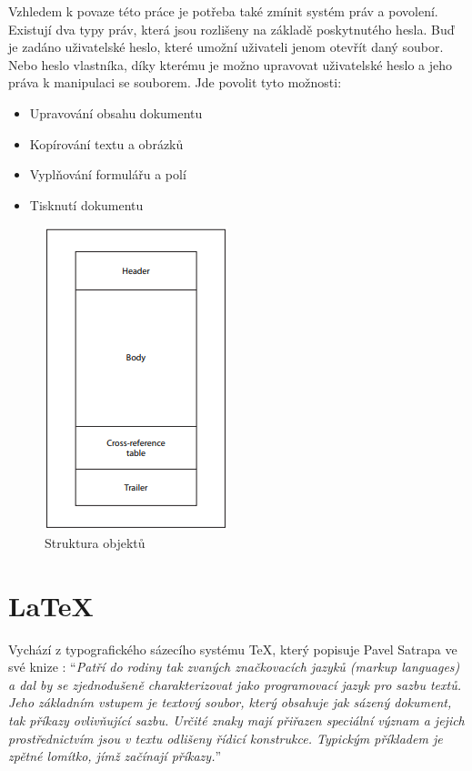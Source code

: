 	Vzhledem k povaze této práce je potřeba také zmínit systém práv a povolení. Existují dva typy práv, která jsou rozlišeny na základě poskytnutého hesla. Buď je zadáno uživatelské heslo, které umožní uživateli jenom otevřít daný soubor. Nebo heslo vlastníka, díky kterému je možno upravovat uživatelské heslo a jeho práva k manipulaci se souborem. Jde povolit tyto možnosti:
	\begin{itemize}
		\item Upravování obsahu dokumentu
		\item Kopírování textu a obrázků 
		\item Vyplňování formulářu a polí
		\item Tisknutí dokumentu
	\end{itemize}

	\begin{figure}[H]
		\includegraphics[scale=0.9]{Untitled}
		\centering
		\caption{Struktura objektů}
		\label{fig:pdf}
	\end{figure}

 \section{LaTeX} 
	Vychází z typografického sázecího systému \TeX, který popisuje Pavel Satrapa ve své knize \cite{latex}: \enquote{\textit{Patří do rodiny tak zvaných značkovacích jazyků (markup languages) a dal by se zjednodušeně charakterizovat jako programovací jazyk pro sazbu textů. Jeho základním vstupem je textový soubor, který obsahuje jak sázený dokument, tak příkazy ovlivňující sazbu. Určité znaky mají přiřazen speciální význam a jejich prostřednictvím jsou v textu odlišeny řídicí konstrukce. Typickým příkladem je zpětné lomítko, jímž začínají příkazy.}}
	
